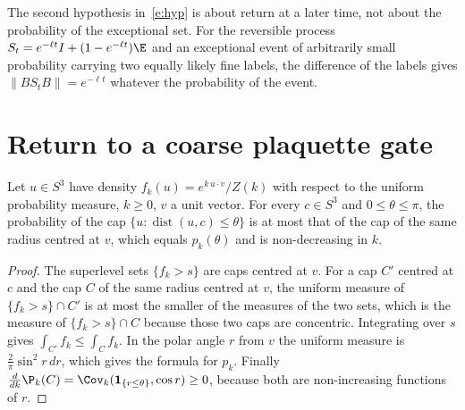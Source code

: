 \begin{remark}\label{r:reset}
The second hypothesis in~\eqref{e:hyp} is about return at a later time, not about the probability of the
exceptional set. For the reversible process $S_t=e^{-\ell t}I+(1-e^{-\ell t})\E$ and an exceptional event of
arbitrarily small probability carrying two equally likely fine labels, the difference of the labels gives
$\|BS_tB\|=e^{-\ell t}$ whatever the probability of the event.
\end{remark}

\section{Return to a coarse plaquette gate}\label{s:ret}
\begin{lemma}\label{l:cap}
Let $u\in S^3$ have density $f_k(u)=e^{k\,u\cdot v}/Z(k)$ with respect to the uniform probability measure,
$k\ge0$, $v$ a unit vector. For every $c\in S^3$ and $0\le\theta\le\pi$, the probability of the cap
$\{u:\operatorname{dist}(u,c)\le\theta\}$ is at most that of the cap of the same radius centred at $v$, which
equals $p_k(\theta)$ and is non-decreasing in $k$.
\end{lemma}
\begin{proof}
The superlevel sets $\{f_k>s\}$ are caps centred at $v$. For a cap $C'$ centred at $c$ and the cap $C$ of the
same radius centred at $v$, the uniform measure of $\{f_k>s\}\cap C'$ is at most the smaller of the measures of
the two sets, which is the measure of $\{f_k>s\}\cap C$ because those two caps are concentric. Integrating
over $s$ gives $\int_{C'}f_k\le\int_Cf_k$. In the polar angle $r$ from $v$ the uniform measure is
$\tfrac2\pi\sin^2r\,dr$, which gives the formula for $p_k$. Finally $\frac{d}{dk}\P_k(C)=
\Cov_k(\mathbf 1_{\{r\le\theta\}},\cos r)\ge0$, because both are non-increasing functions of $r$.
\end{proof}

